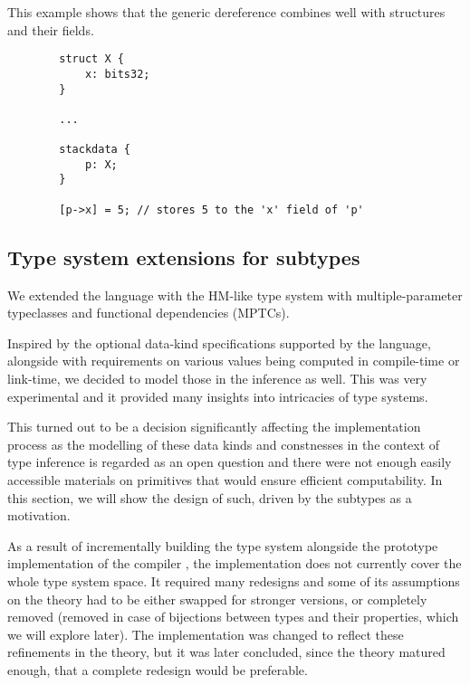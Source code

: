 \begin{ex}
    This example shows that the generic dereference combines well with structures and their fields.

    \begin{lstlisting}
        struct X {
            x: bits32;
        }

        ...

        stackdata {
            p: X;
        }

        [p->x] = 5; // stores 5 to the 'x' field of 'p'
    \end{lstlisting}
\end{ex}

\subsection{Type system extensions for \cmm subtypes}
\label{sec:typesystem}

We extended the language with the HM-like type system with multiple-parameter typeclasses and functional dependencies (MPTCs).

Inspired by the optional data-kind specifications supported by the \cmm language, alongside with requirements on various values being computed in compile-time or link-time, we decided to model those in the inference as well. This was very experimental and it provided many insights into intricacies of type systems.

This turned out to be a decision significantly affecting the implementation process as the modelling of these data kinds and constnesses in the context of type inference is regarded as an open question and there were not enough easily accessible materials on primitives that would ensure efficient computability. In this section, we will show the design of such, driven by the \cmm subtypes as a motivation.

As a result of incrementally building the type system alongside the prototype implementation of the compiler \cite{klepl2022compiler}, the implementation does not currently cover the whole type system space. It required many redesigns and some of its assumptions on the theory had to be either swapped for stronger versions, or completely removed (removed in case of bijections between types and their properties, which we will explore later). The implementation was changed to reflect these refinements in the theory, but it was later concluded, since the theory matured enough, that a complete redesign would be preferable.

